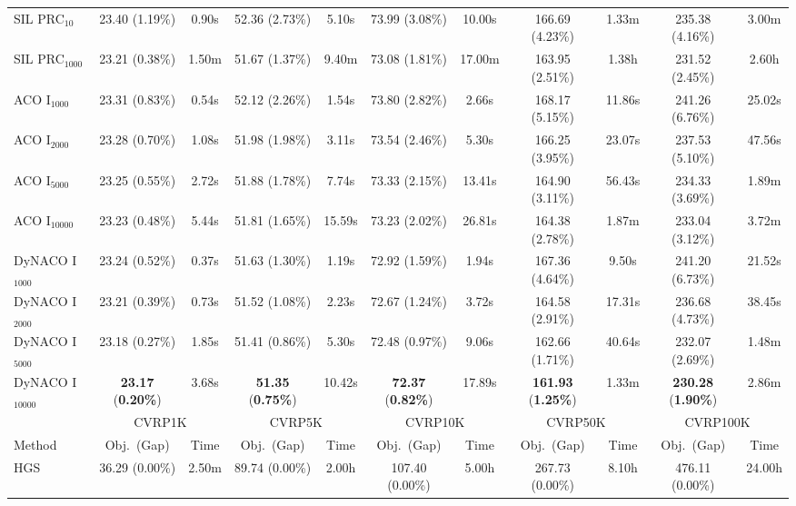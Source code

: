 \documentclass[sigconf]{acmart}
\newcommand{\CVRP}{\textsc{CVRP}}
\begin{document}
\begin{table}[t]
{\begin{tabular}{lcccccccccc}
SIL PRC$_{10}$ & 23.40 (1.19\%) & 0.90s & 52.36 (2.73\%) & 5.10s & 73.99 (3.08\%) & 10.00s & 166.69 (4.23\%) & 1.33m & 235.38 (4.16\%) & 3.00m \\
SIL PRC$_{1000}$ & 23.21 (0.38\%) & 1.50m & 51.67 (1.37\%) & 9.40m & 73.08 (1.81\%) & 17.00m & 163.95 (2.51\%) & 1.38h & 231.52 (2.45\%) & 2.60h \\
\midrule
ACO I$_{1000}$ & 23.31 (0.83\%) & 0.54s & 52.12 (2.26\%) & 1.54s & 73.80 (2.82\%) & 2.66s & 168.17 (5.15\%) & 11.86s & 241.26 (6.76\%) & 25.02s \\
ACO I$_{2000}$ & 23.28 (0.70\%) & 1.08s & 51.98 (1.98\%) & 3.11s & 73.54 (2.46\%) & 5.30s & 166.25 (3.95\%) & 23.07s & 237.53 (5.10\%) & 47.56s \\
ACO I$_{5000}$ & 23.25 (0.55\%) & 2.72s & 51.88 (1.78\%) & 7.74s & 73.33 (2.15\%) & 13.41s & 164.90 (3.11\%) & 56.43s & 234.33 (3.69\%) & 1.89m \\
ACO I$_{10000}$ & 23.23 (0.48\%) & 5.44s & 51.81 (1.65\%) & 15.59s & 73.23 (2.02\%) & 26.81s & 164.38 (2.78\%) & 1.87m & 233.04 (3.12\%) & 3.72m \\
\midrule
DyNACO I$_{1000}$ & 23.24 (0.52\%) & 0.37s & 51.63 (1.30\%) & 1.19s & 72.92 (1.59\%) & 1.94s & 167.36 (4.64\%) & 9.50s & 241.20 (6.73\%) & 21.52s \\
DyNACO I$_{2000}$ & 23.21 (0.39\%) & 0.73s & 51.52 (1.08\%) & 2.23s & 72.67 (1.24\%) & 3.72s & 164.58 (2.91\%) & 17.31s & 236.68 (4.73\%) & 38.45s \\
DyNACO I$_{5000}$ & 23.18 (0.27\%) & 1.85s & 51.41 (0.86\%) & 5.30s & 72.48 (0.97\%) & 9.06s & 162.66 (1.71\%) & 40.64s & 232.07 (2.69\%) & 1.48m \\
DyNACO I$_{10000}$ & \textbf{23.17} (\textbf{0.20\%}) & 3.68s & \textbf{51.35} (\textbf{0.75\%}) & 10.42s & \textbf{72.37} (\textbf{0.82\%}) & 17.89s & \textbf{161.93} (\textbf{1.25\%}) & 1.33m & \textbf{230.28} (\textbf{1.90\%}) & 2.86m \\
\midrule
\midrule
& \multicolumn{2}{c}{\CVRP{}1K} & \multicolumn{2}{c}{\CVRP{}5K} & \multicolumn{2}{c}{\CVRP{}10K} & \multicolumn{2}{c}{\CVRP{}50K} & \multicolumn{2}{c}{\CVRP{}100K} \\
\cmidrule(lr){2-3} \cmidrule(lr){4-5} \cmidrule(lr){6-7} \cmidrule(lr){8-9} \cmidrule(lr){10-11}
Method & Obj.\ (Gap) & Time & Obj.\ (Gap) & Time & Obj.\ (Gap) & Time & Obj.\ (Gap) & Time & Obj.\ (Gap) & Time \\
\midrule
HGS & 36.29 (0.00\%) & 2.50m & 89.74 (0.00\%) & 2.00h & 107.40 (0.00\%) & 5.00h & 267.73 (0.00\%) & 8.10h & 476.11 (0.00\%) & 24.00h \\

\end{tabular}}
\end{table}
\end{document}
